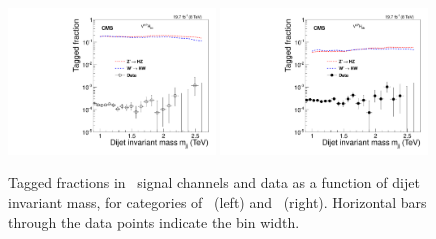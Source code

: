 \begin{figure}[ht!b]
\begin{center}
\includegraphics[width=0.49\textwidth]{EXO-14-009/HbbZqqfigs/Signal/HbbVqq-signal-taggingEff-8TeV.pdf}
\includegraphics[width=0.49\textwidth]{EXO-14-009/HbbZqqfigs/Signal/HbbVqq-signal-taggingEff-LowV-8TeV.pdf}
\end{center}
\caption{
Tagged fractions in \HbbVqq\ signal channels and data
as a function of dijet invariant mass, for categories of 
\HbbHP\ (left) and \HbbLP\ (right). Horizontal bars 
through the data points indicate the bin width. 
}
\label{fig:HbbZqqOverallEff}
\end{figure}

